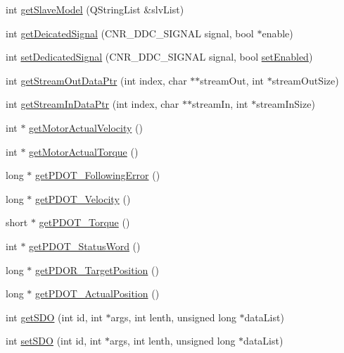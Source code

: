 \begin{DoxyCompactItemize}
\item 
int \hyperlink{classCUIApp_aef270c9f46a09ee42c4a6213e6a0ef3f}{get\-Slave\-Model} (Q\-String\-List \&slv\-List)
\item 
int \hyperlink{classCUIApp_a1c84efc8030021d30cb46f3b039b83d7}{get\-Deicated\-Signal} (C\-N\-R\-\_\-\-D\-D\-C\-\_\-\-S\-I\-G\-N\-A\-L signal, bool $\ast$enable)
\item 
int \hyperlink{classCUIApp_ac72855acb2d3366031e8a4a505a621a0}{set\-Dedicated\-Signal} (C\-N\-R\-\_\-\-D\-D\-C\-\_\-\-S\-I\-G\-N\-A\-L signal, bool \hyperlink{classCUIApp_a0bb9aaecc950f991d3ecc69e5895e9e6}{set\-Enabled})
\item 
int \hyperlink{classCUIApp_a0d79b0192a15add46a819e60fe4d0732}{get\-Stream\-Out\-Data\-Ptr} (int index, char $\ast$$\ast$stream\-Out, int $\ast$stream\-Out\-Size)
\item 
int \hyperlink{classCUIApp_a504641fc0d9f2a8d40ea3e513d7d1bd5}{get\-Stream\-In\-Data\-Ptr} (int index, char $\ast$$\ast$stream\-In, int $\ast$stream\-In\-Size)
\item 
int $\ast$ \hyperlink{classCUIApp_a4a20047ab2d7ec753785db2b4b955666}{get\-Motor\-Actual\-Velocity} ()
\item 
int $\ast$ \hyperlink{classCUIApp_a022c1b824525745e09c6080c22ac179a}{get\-Motor\-Actual\-Torque} ()
\item 
long $\ast$ \hyperlink{classCUIApp_a3c11238c75f11140c7bc79ec6c69d175}{get\-P\-D\-O\-T\-\_\-\-Following\-Error} ()
\item 
long $\ast$ \hyperlink{classCUIApp_a7b5fcf976a2f6b7c5d396ad379cfe30a}{get\-P\-D\-O\-T\-\_\-\-Velocity} ()
\item 
short $\ast$ \hyperlink{classCUIApp_a1aad67b6ffa78081b285c4b55b601b93}{get\-P\-D\-O\-T\-\_\-\-Torque} ()
\item 
int $\ast$ \hyperlink{classCUIApp_adfc9ee94df8b0e299985f4e7de4e9755}{get\-P\-D\-O\-T\-\_\-\-Status\-Word} ()
\item 
long $\ast$ \hyperlink{classCUIApp_a0d9628c8df6c1d9f924aee1e6b77ebce}{get\-P\-D\-O\-R\-\_\-\-Target\-Position} ()
\item 
long $\ast$ \hyperlink{classCUIApp_a14862672a7dd6fe4cff9927dc28abce4}{get\-P\-D\-O\-T\-\_\-\-Actual\-Position} ()
\item 
int \hyperlink{classCUIApp_a339bd304f36c7eafa52efd7d06742b33}{get\-S\-D\-O} (int id, int $\ast$args, int lenth, unsigned long $\ast$data\-List)
\item 
int \hyperlink{classCUIApp_a7db69eefe8a46e4e7b2791ada7efe719}{set\-S\-D\-O} (int id, int $\ast$args, int lenth, unsigned long $\ast$data\-List)

\end{DoxyCompactItemize}
